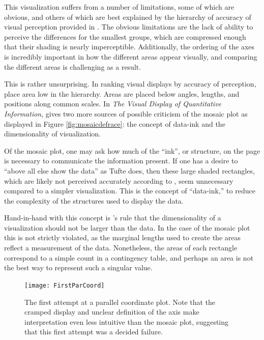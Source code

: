 This visualization suffers from a number of limitations, some of which are obvious, and others of which are best explained by
the hierarchy of accuracy of visual perception provided in \cite{cleveland1987}. The obvious limitations are the lack of ability
to perceive the differences for the smallest groups, which are compressed enough that their shading is nearly
imperceptible. Additionally, the ordering of the axes is incredibly important in how the different areas appear visually, and
comparing the different areas is challenging as a result.

This is rather unsurprising. In ranking visual displays by accuracy of perception, \cite{cleveland1987} place area
low in the hierarchy. Areas are placed below angles, lengths, and positions along common scales. In \textit{The Visual Display of
  Quantitative Information}, \citeauthor{VisualDisplayQuant} gives two more sources of possible criticism of the mosaic plot as
displayed in Figure \ref{fig:mosaicdefrace}: the concept of data-ink and the dimensionality of visualization.

Of the mosaic plot, one may ask how much of the ``ink'', or structure, on the page is necessary to communicate the information
present. If one has a desire to ``above all else show the data'' as Tufte does, then these large shaded rectangles, which are
likely not perceived accurately according to \citeauthor{cleveland1987}, seem unnecessary compared to a simpler
visualization. This is the concept of ``data-ink,'' to reduce the complexity of the structures used to display the
data.

Hand-in-hand with this concept is \citeauthor{VisualDisplayQuant}'s rule that the dimensionality of a visualization should not be
larger than the data. In the case of the mosaic plot this is not strictly violated, as the marginal lengths used to create the
areas reflect a measurement of the data. Nonetheless, the areas of each rectangle correspond to a simple count in a contingency
table, and perhaps an area is not the best way to represent such a singular value.

\begin{figure}[!h]
  \centering
  \texttt{[image: FirstParCoord]}
  \caption[First Parallel Coordinate Attempt]{\footnotesize The first attempt at a parallel coordinate plot. Note that the cramped
    display and unclear definition of the axis make interpretation even less intuitive than the mosaic plot, suggesting that this
    first attempt was a decided failure.}
  \label{fig:firstparcoord}
\end{figure}

